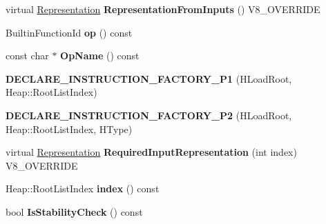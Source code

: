 \begin{DoxyCompactItemize}
\item 
\hypertarget{classv8_1_1internal_1_1_v8___f_i_n_a_l_adf198742368d46a5275c303414fdfc1d}{}virtual \hyperlink{classv8_1_1internal_1_1_representation}{Representation} {\bfseries Representation\+From\+Inputs} () V8\+\_\+\+O\+V\+E\+R\+R\+I\+D\+E\label{classv8_1_1internal_1_1_v8___f_i_n_a_l_adf198742368d46a5275c303414fdfc1d}

\item 
\hypertarget{classv8_1_1internal_1_1_v8___f_i_n_a_l_a4c11e48ddcc56dd00c053b034e22f4a5}{}Builtin\+Function\+Id {\bfseries op} () const \label{classv8_1_1internal_1_1_v8___f_i_n_a_l_a4c11e48ddcc56dd00c053b034e22f4a5}

\item 
\hypertarget{classv8_1_1internal_1_1_v8___f_i_n_a_l_aa7c2b4be4286e37bc7b7a243044db017}{}const char $\ast$ {\bfseries Op\+Name} () const \label{classv8_1_1internal_1_1_v8___f_i_n_a_l_aa7c2b4be4286e37bc7b7a243044db017}

\item 
\hypertarget{classv8_1_1internal_1_1_v8___f_i_n_a_l_a935a7ee74f7a32c8eafe816247a04d05}{}{\bfseries D\+E\+C\+L\+A\+R\+E\+\_\+\+I\+N\+S\+T\+R\+U\+C\+T\+I\+O\+N\+\_\+\+F\+A\+C\+T\+O\+R\+Y\+\_\+\+P1} (H\+Load\+Root, Heap\+::\+Root\+List\+Index)\label{classv8_1_1internal_1_1_v8___f_i_n_a_l_a935a7ee74f7a32c8eafe816247a04d05}

\item 
\hypertarget{classv8_1_1internal_1_1_v8___f_i_n_a_l_a9643e927d8a562fdf166fccaa8d5c92d}{}{\bfseries D\+E\+C\+L\+A\+R\+E\+\_\+\+I\+N\+S\+T\+R\+U\+C\+T\+I\+O\+N\+\_\+\+F\+A\+C\+T\+O\+R\+Y\+\_\+\+P2} (H\+Load\+Root, Heap\+::\+Root\+List\+Index, H\+Type)\label{classv8_1_1internal_1_1_v8___f_i_n_a_l_a9643e927d8a562fdf166fccaa8d5c92d}

\item 
\hypertarget{classv8_1_1internal_1_1_v8___f_i_n_a_l_a6c6d1f37f40b113d8f4062f1ffff7215}{}virtual \hyperlink{classv8_1_1internal_1_1_representation}{Representation} {\bfseries Required\+Input\+Representation} (int index) V8\+\_\+\+O\+V\+E\+R\+R\+I\+D\+E\label{classv8_1_1internal_1_1_v8___f_i_n_a_l_a6c6d1f37f40b113d8f4062f1ffff7215}

\item 
\hypertarget{classv8_1_1internal_1_1_v8___f_i_n_a_l_a7f57493b582684cb3496981652fa7dd5}{}Heap\+::\+Root\+List\+Index {\bfseries index} () const \label{classv8_1_1internal_1_1_v8___f_i_n_a_l_a7f57493b582684cb3496981652fa7dd5}

\item 
\hypertarget{classv8_1_1internal_1_1_v8___f_i_n_a_l_a3e806f3f567dc11a440bd6a79eb717c5}{}bool {\bfseries Is\+Stability\+Check} () const \label{classv8_1_1internal_1_1_v8___f_i_n_a_l_a3e806f3f567dc11a440bd6a79eb717c5}


\end{DoxyCompactItemize}
